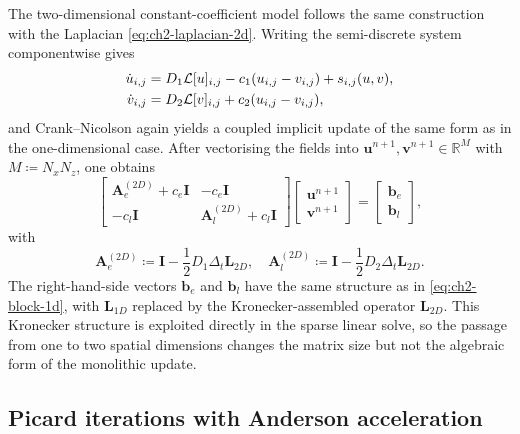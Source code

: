 The two-dimensional constant-coefficient model follows the same construction with the Laplacian \eqref{eq:ch2-laplacian-2d}. Writing the semi-discrete system componentwise gives
\begin{align}
    \dot{u}_{i,j} & = D_1 \mathcal{L}[u]_{i,j} - c_1(u_{i,j} - v_{i,j}) + s_{i,j}(u,v), \notag \\
    \dot{v}_{i,j} & = D_2 \mathcal{L}[v]_{i,j} + c_2(u_{i,j} - v_{i,j}),
\end{align}
and Crank--Nicolson again yields a coupled implicit update of the same form as in the one-dimensional case. After vectorising the fields into $\mathbf{u}^{n+1}, \mathbf{v}^{n+1} \in \mathbb{R}^{M}$ with $M \coloneqq N_x N_z$, one obtains
\begin{equation}
    \begin{bmatrix}
        \mathbf{A}_e^{(2D)} + c_e \mathbf{I} & -c_e \mathbf{I}                      \\
        -c_l \mathbf{I}                      & \mathbf{A}_l^{(2D)} + c_l \mathbf{I}
    \end{bmatrix}
    \begin{bmatrix}
        \mathbf{u}^{n+1} \\
        \mathbf{v}^{n+1}
    \end{bmatrix}
    =
    \begin{bmatrix}
        \mathbf{b}_e \\
        \mathbf{b}_l
    \end{bmatrix},
    \label{eq:ch2-block-2d}
\end{equation}
with
\begin{equation*}
    \mathbf{A}_e^{(2D)} \coloneqq \mathbf{I} - \frac{1}{2} D_1 \Delta_t \mathbf{L}_{2D}, \quad
    \mathbf{A}_l^{(2D)} \coloneqq \mathbf{I} - \frac{1}{2} D_2 \Delta_t \mathbf{L}_{2D}.
\end{equation*}
The right-hand-side vectors $\mathbf{b}_e$ and $\mathbf{b}_l$ have the same structure as in \eqref{eq:ch2-block-1d}, with $\mathbf{L}_{1D}$ replaced by the Kronecker-assembled operator $\mathbf{L}_{2D}$. This Kronecker structure is exploited directly in the sparse linear solve, so the passage from one to two spatial dimensions changes the matrix size but not the algebraic form of the monolithic update.

\subsection{Picard iterations with Anderson acceleration}
\label{sec:ch2-picard}

